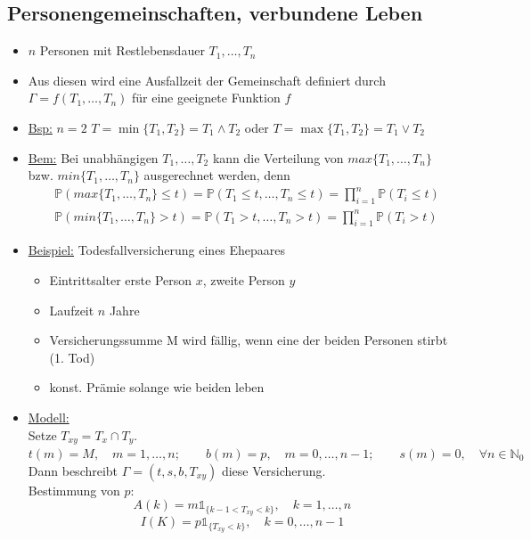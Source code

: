 \subsection{Personengemeinschaften, verbundene Leben}
\label{sub:verbundene_leben}
\begin{itemize}
	\item $n$ Personen mit Restlebensdauer $T_1,\dots,T_n$
	\item Aus diesen wird eine Ausfallzeit der Gemeinschaft definiert durch $\Gamma=f(T_1,\dots,T_n)$ für eine geeignete Funktion $f$
	\item \uline{Bsp:} $n=2$ $T=\min\{T_1,T_2\}=T_1\land T_2$ oder $T=\max\{T_1,T_2\}=T_1\lor T_2$
	\item \uline{Bem:} Bei unabhängigen $T_1,\dots,T_2$ kann die Verteilung von $max\{T_1,\dots,T_n\}$ bzw. $min\{T_1,\dots,T_n\}$ ausgerechnet werden, denn
	\begin{equation*}
	\begin{aligned}
		&\mathds{P}(max\{T_1,\dots,T_n\}\le t)=\mathds{P}(T_1\le t,\dots,T_n\le t)=\prod_{i=1}^{n}\mathds{P}(T_i\le t)\\
		&\mathds{P}(min\{T_1,\dots,T_n\}>t)=\mathds{P}(T_1>t,\dots,T_n>t)=\prod_{i=1}^{n}\mathds{P}(T_i>t)
	\end{aligned}
	\end{equation*}
	\item \uline{Beispiel:} Todesfallversicherung eines Ehepaares
	\begin{itemize}
		\item Eintrittsalter erste Person $x$, zweite Person $y$
		\item Laufzeit $n$ Jahre
		\item Versicherungssumme M wird fällig, wenn eine der beiden Personen stirbt (1. Tod)
		\item konst. Prämie solange wie beiden leben
	\end{itemize}
	\item \uline{Modell:}\\
	Setze $T_{xy}=T_x\cap T_y$.\\
	$t(m)=M,\quad m=1,\dots,n;\qquad b(m)=p, \quad m=0,\dots,n-1;\qquad s(m)=0,\quad \forall n\in \mathds{N}_0$\\
	Dann beschreibt $\Gamma=(t,s,b,T_{xy})$ diese Versicherung.\\
	Bestimmung von $p$:\\
	\[A(k)=m\mathbb{1}_{\{k-1<T_{xy}<k\}}, \quad k=1,\dots,n\]
	\[I(K)=p\mathbb{1}_{\{T_{xy}<k\}}, \quad k=0,\dots,n-1\]

\end{itemize}
